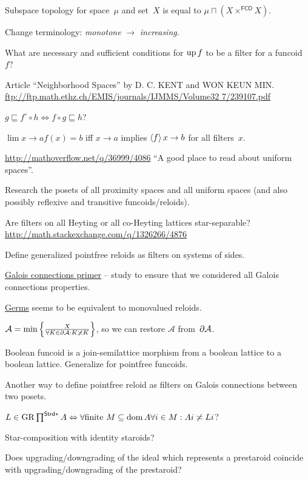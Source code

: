 \documentclass{amsart}
\begin{document}
Subspace topology for space~$\mu$ and set~$X$ is equal to $\mu\sqcap(X\times^{\mathsf{FCD}} X)$.

Change terminology: \emph{monotone} $\rightarrow$ \emph{increasing}.

What are necessary and sufficient conditions for $\operatorname{up} f$ to be a filter for a funcoid~$f$?

Article ``Neighborhood Spaces'' by D. C. KENT and WON KEUN MIN.
\url{ftp://ftp.math.ethz.ch/EMIS/journals/IJMMS/Volume32 7/239107.pdf}

$g\sqsubseteq f^{\circ}\circ h \Leftrightarrow f\circ g\sqsubseteq h$?

$\lim {x\rightarrow a} f(x) = b$ iff $x\rightarrow a$ implies $\left\langle f\right\rangle x\rightarrow b$ for all filters~$x$.

\url{http://mathoverflow.net/q/36999/4086} ``A good place to read about uniform spaces''.

Research the posets of all proximity spaces and all uniform spaces (and also possibly reflexive and transitive funcoids/reloids).

Are filters on all Heyting or all co-Heyting lattices star-separable?
\url{http://math.stackexchange.com/q/1326266/4876}

Define generalized pointfree reloids as filters on systems of sides.

\href{https://www.math.ksu.edu/~strecker/primer.ps}{Galois connections primer} -- study to ensure that we considered all Galois connections properties.

\href{https://en.wikipedia.org/wiki/Germ (mathematics)}{Germs} seems to be equivalent to monovalued reloids.

$\mathcal{A} = \min\left\{ \frac{X}{\forall K\in\partial\mathcal{A}:K\not\asymp K}\right\}$, so we can restore $\mathcal{A}$ from~$\partial\mathcal{A}$.

Boolean funcoid is a join-semilattice morphism from a boolean lattice to a boolean lattice. Generalize for pointfree funcoids.

Another way to define pointfree reloid as filters on Galois connections between two posets.

$L \in \operatorname{GR} \prod^{\mathsf{Strd} \ast} A \Leftrightarrow \forall
\text{finite } M \subseteq \operatorname{dom} A \forall i \in M : A i \not\asymp L i$?

Star-composition with identity staroids?

Does upgrading/downgrading of the ideal which represents a prestaroid coincide with upgrading/downgrading of the prestaroid?
\end{document}
